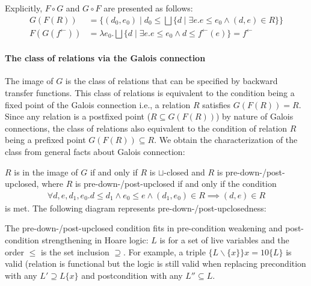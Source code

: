 \documentclass{llncs}
\newcommand{\fb}{{f^{\leftarrow}}}
\newcommand{\join}{\sqcup}
\newcommand{\bigjoin}{\bigsqcup}
\newcommand{\comp}{\circ}
\newcommand{\rotleq}{\rotatebox[origin=c]{90}{$\leq$}}
\begin{document}
  Explicitly, $F \comp G$ and $G \comp F$ are presented as follows:
  \begin{align*}
    G(F(R)) &= \{ (d_{0},e_{0}) \mid d_{0} \leq \bigjoin \{ d \mid \exists e.e \leq e_{0} \land (d,e) \in R \}\} \\
    F(G(\fb)) &= \lambda e_{0} . \bigjoin \{ d \mid \exists e. e \leq e_{0} \land d \leq \fb(e) \} = \fb
  \end{align*}

\paragraph{The class of relations via the Galois connection}
  The image of $G$ is the class of relations that can be specified by backward transfer functions.
  This class of relations is equivalent to the condition being a fixed point of the Galois connection i.e., a relation $R$ satisfies $G(F(R)) = R$. Since any relation is a postfixed point ($R \subseteq G(F(R))$) by nature of Galois connections, the class of relations also equivalent to the condition of relation $R$ being a prefixed point $G(F(R)) \subseteq R$.
  We obtain the characterization of the class from general facts about Galois connection:
  \begin{proposition}\label{prop:predown-postup}
  $R$ is in the image of $G$ if and only if $R$ is $\join$-closed and $R$ is pre-down-/post-upclosed,
  where $R$ is pre-down-/post-upclosed if and only if the condition
  \begin{align*}
  \forall d, e, d_{1 }, e_{0}. d \leq d_{1} \land e_{0} \leq e \land (d_{1}, e_{0}) \in R \implies (d, e) \in R
  \end{align*}
  is met.
  The following diagram represents pre-down-/post-upclosedness:
  \begin{center}
  \end{center}
  \end{proposition}


  \begin{example}
    The pre-down-/post-upclosed condition fits in pre-condition weakening and post-condition strengthening in Hoare logic: $L$ is for a set of live variables and the order $\leq$ is the set inclusion $\supseteq$.
    For example, a triple $\{ L \backslash \{ x \} \} x = 10 \{ L \}$ is valid (relation is functional but the logic is still valid when replacing precondition with any $L' \supseteq L \{ x \}$ and postcondition with any $L'' \subseteq L$.
  \end{example}
\end{document}
